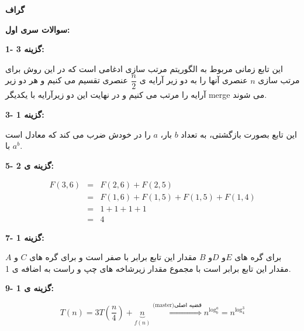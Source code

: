\documentclass[12pt,fleqn,a4paper]{article}
\begin{document}

\begin{center}
{\bf گراف}
\end{center}

\vspace{2cm}
\begin{center}
{\bf سوالات سری اول:}
\end{center}

{\bf 
1- گزینه 3:
}

این تابع زمانی مربوط به الگوریتم مرتب سازی ادغامی است که در این روش برای مرتب سازی $n$ عنصری آنها را به دو زیر آرایه ی 
$\dfrac{n}{2}$ عنصری تقسیم می کنیم و هر دو زیر آرایه را مرتب می کنیم  و در نهایت این دو زیرآرایه با یکدیگر merge  می شوند.

{\bf 
3- گزینه 1:
}

این تابع بصورت بازگشتی، به تعداد $b$ بار، $a$  را در خودش ضرب می کند که معادل است با $a^b$.

{\bf 5- گزینه ی 2:}

\begin{eqnarray*}
F(3,6) 
&=& F(2,6) + F(2,5) \\
&=& F(1,6) + F(1,5) + F(1,5) + F(1,4) \\
&=& 1 + 1 + 1 + 1 \\
&=& 4
\end{eqnarray*}

{\bf 7- گزینه 1:}

برای گره های $E$و  $D$و  $B$ مقدار این تابع برابر با صفر است و برای گره های $C$ و $A$ مقدار این تابع برابر است با مجموع مقدار زیرشاخه های چپ و راست به اضافه ی 1.



{\bf 9- گزینه ی 1:}

\begin{equation*}
T(n)=3T(\frac{n}{4})+\underbrace{n}_{f(n)} 
\stackrel{\text{(master)}\text{قضیه اصلی}}{\Longrightarrow}
n^{\log_b^a}=n^{\log_4^3}	
\end{equation*}
\end{document}
